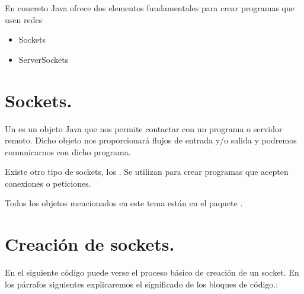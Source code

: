 \documentclass[letterpaper,10pt,spanish]{sphinxmanual}
\begin{document}
En concreto Java ofrece dos elementos fundamentales para crear programas que usen redes
\begin{itemize}
\item {} 
Sockets

\item {} 
ServerSockets

\end{itemize}


\section{Sockets.}
\label{\detokenize{textos/tema3:sockets}}
Un  es un objeto Java que nos permite contactar con un programa o servidor remoto. Dicho objeto nos proporcionará flujos de entrada y/o salida y podremos comunicarnos con dicho programa.

Existe otro tipo de sockets, los . Se utilizan para crear programas que acepten conexiones o peticiones.

Todos los objetos mencionados en este tema están en el paquete .


\section{Creación de sockets.}
\label{\detokenize{textos/tema3:creacion-de-sockets}}
En el siguiente código puede verse el proceso básico de creación de un socket. En los párrafos siguientes explicaremos el significado de los bloques de código.:
\end{document}
